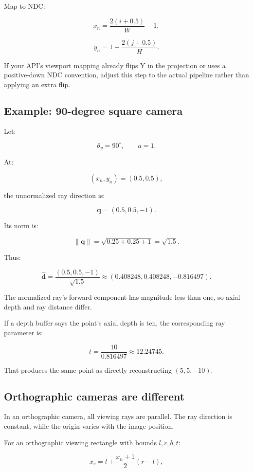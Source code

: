Map to NDC:

\[ \boxed{ x_n=\frac{2(i+0.5)}W-1, } \]

\[ \boxed{ y_n=1-\frac{2(j+0.5)}H. } \]

If your API's viewport mapping already flips Y in the projection or uses a positive-down NDC convention, adjust this step to the actual pipeline rather than applying an extra flip.

\subsection{Example: 90-degree square camera}\label{02-foundations-ii-ch035-example-90-degree-square-camera}

Let:

\[ \theta_y=90^\circ,\qquad a=1. \]

At:

\[ (x_n,y_n)=(0.5,0.5), \]

the unnormalized ray direction is:

\[ \mathbf q=(0.5,0.5,-1). \]

Its norm is:

\[ \|\mathbf q\|= \sqrt{0.25+0.25+1} =\sqrt{1.5}. \]

Thus:

\[ \boxed{ \hat{\mathbf d} = \frac{(0.5,0.5,-1)}{\sqrt{1.5}} \approx (0.408248,0.408248,-0.816497). } \]

The normalized ray's forward component has magnitude less than one, so axial depth and ray distance differ.

If a depth buffer says the point's axial depth is ten, the corresponding ray parameter is:

\[ t=\frac{10}{0.816497}\approx12.24745. \]

That produces the same point as directly reconstructing \((5,5,-10)\).

\subsection{Orthographic cameras are different}\label{02-foundations-ii-ch035-orthographic-cameras-are-different}

In an orthographic camera, all viewing rays are parallel. The ray direction is constant, while the origin varies with the image position.

For an orthographic viewing rectangle with bounds \(l,r,b,t\):

\[ x_v=l+\frac{x_n+1}{2}(r-l), \]

